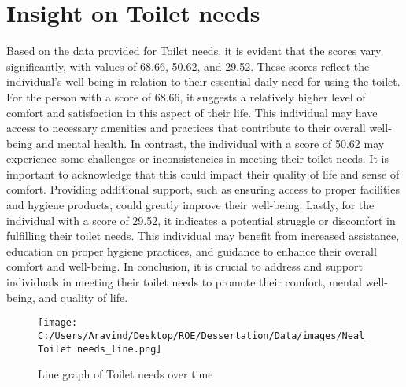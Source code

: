 \documentclass[10pt, a4paper]{article}%
\begin{document}
\section{Insight on Toilet needs}%
\label{sec:InsightonToiletneeds}%
Based on the data provided for Toilet needs, it is evident that the scores vary significantly, with values of 68.66, 50.62, and 29.52. These scores reflect the individual's well{-}being in relation to their essential daily need for using the toilet.\newline%
\newline%
For the person with a score of 68.66, it suggests a relatively higher level of comfort and satisfaction in this aspect of their life. This individual may have access to necessary amenities and practices that contribute to their overall well{-}being and mental health.\newline%
\newline%
In contrast, the individual with a score of 50.62 may experience some challenges or inconsistencies in meeting their toilet needs. It is important to acknowledge that this could impact their quality of life and sense of comfort. Providing additional support, such as ensuring access to proper facilities and hygiene products, could greatly improve their well{-}being.\newline%
\newline%
Lastly, for the individual with a score of 29.52, it indicates a potential struggle or discomfort in fulfilling their toilet needs. This individual may benefit from increased assistance, education on proper hygiene practices, and guidance to enhance their overall comfort and well{-}being.\newline%
\newline%
In conclusion, it is crucial to address and support individuals in meeting their toilet needs to promote their comfort, mental well{-}being, and quality of life.%


\begin{figure}[H]%
\centering%
\texttt{[image: C:/Users/Aravind/Desktop/ROE/Dessertation/Data/images/Neal\_Toilet needs\_line.png]}%
\caption{Line graph of Toilet needs over time}%
\end{figure}

%
\end{document}
